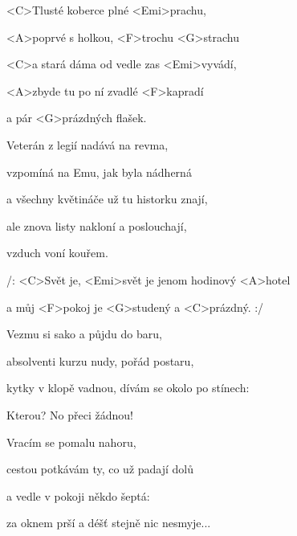 

\zs
<C>Tlusté koberce plné <Emi>prachu,

<A>poprvé s holkou, <F>trochu <G>strachu

<C>a stará dáma od vedle zas <Emi>vyvádí,

<A>zbyde tu po ní zvadlé <F>kapradí

a pár <G>prázdných flašek.

\ks
\zs

Veterán z legií nadává na revma,

vzpomíná na Emu, jak byla nádherná

a všechny květináče už tu historku znají,

ale znova listy nakloní a poslouchají,

vzduch voní kouřem.
\ks

\zr
/: <C>Svět je, <Emi>svět je jenom hodinový <A>hotel

a můj <F>pokoj je <G>studený a <C>prázdný. :/
\kr

\zs
Vezmu si sako a půjdu do baru,

absolventi kurzu nudy, pořád postaru,

kytky v klopě vadnou, dívám se okolo po stínech:

Kterou? No přeci žádnou!

\ks
\zs

Vracím se pomalu nahoru,

cestou potkávám ty, co už padají dolů

a vedle v pokoji někdo šeptá: 

za oknem prší a déšť stejně nic nesmyje...
\ks

\zr \kr

\kp
